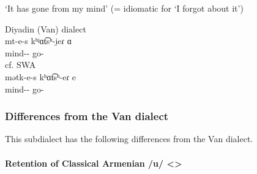 \begin{table}[H]
	\centering
	\caption{Ablative suffixs in the Diyadin subdialect of the Van dialect}
	\label{tab:Van:subdialect:diyadin:same:abl}
\end{table} 

\begin{exe}
	\ex `It has gone from my mind' (= idiomatic for `I forgot about it') \label{sent:Van:subdialect:diyadin:same:abl}
	\begin{xlist}
		\ex Diyadin (Van) dialect \\ \gll mt-e-s kʰʲɑt͡sʰ-i̯eɾ ɑ \\
		mind-{\abl}-{\possFsg} go-{\perfcvb} {\aux} \\
		\trans {} 
		\ex cf. SWA  \\ \gll mətk-e-s kʰɑt͡sʰ-eɾ e \\
		mind-{\abl}-{\possFsg} go-{\eptcp} {\aux} \\
		\trans {}
	\end{xlist}
\end{exe}

\subsubsection{Differences from the Van dialect}
This subdialect has the following differences from the Van dialect. 


\paragraph{Retention of Classical Armenian /u/ <> } 



